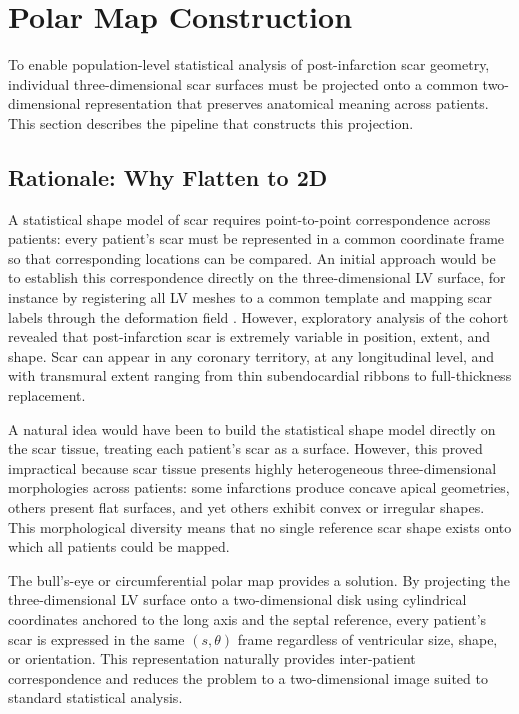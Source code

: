 \section{Polar Map Construction}
\label{sec:polarmaps}

To enable population-level statistical analysis of post-infarction scar geometry, individual
three-dimensional scar surfaces must be projected onto a common two-dimensional
representation that preserves anatomical meaning across patients. This section describes
the pipeline that constructs this projection.

\subsection{Rationale: Why Flatten to 2D}

A statistical shape model of scar requires point-to-point correspondence across patients:
every patient's scar must be represented in a common coordinate frame so that
corresponding locations can be compared. An initial approach would be to establish this
correspondence directly on the three-dimensional LV surface, for instance by registering all
LV meshes to a common template and mapping scar labels through the deformation
field \cite{doste2026}.
However, exploratory analysis of the cohort revealed that post-infarction scar is extremely
variable in position, extent, and shape. Scar can appear in any coronary territory, at any
longitudinal level, and with transmural extent ranging from thin subendocardial ribbons to
full-thickness replacement.

A natural idea would have been to build the statistical shape model directly on the scar
tissue, treating each patient's scar as a surface. However, this proved impractical because
scar tissue presents highly heterogeneous three-dimensional morphologies across patients:
some infarctions produce concave apical geometries, others present flat surfaces, and yet
others exhibit convex or irregular shapes. This morphological diversity means that no single
reference scar shape exists onto which all patients could be mapped.

The bull's-eye or circumferential polar map provides a solution. By projecting the
three-dimensional LV surface onto a two-dimensional disk using cylindrical coordinates
anchored to the long axis and the septal reference, every patient's scar is expressed in the
same $(s, \theta)$ frame regardless of ventricular size, shape, or orientation. This
representation naturally provides inter-patient correspondence and reduces the problem to a
two-dimensional image suited to standard statistical analysis.

